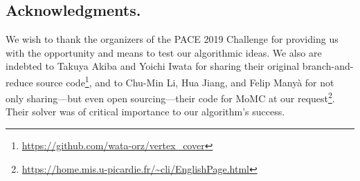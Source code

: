 \documentclass[twoside,leqno,twocolumn]{article}
\begin{document}
\subsection*{Acknowledgments.}
We wish to thank the organizers of the PACE 2019 Challenge for providing us with the opportunity and means to test our algorithmic ideas. We also are indebted to Takuya Akiba and  Yoichi Iwata for sharing their original branch-and-reduce source code\footnote{\url{https://github.com/wata-orz/vertex_cover}}, and to Chu-Min Li, Hua Jiang, and Felip Many\`a for not only sharing---but even open sourcing---their code for MoMC at our request\footnote{\url{https://home.mis.u-picardie.fr/~cli/EnglishPage.html}}. Their solver was of critical importance to our algorithm's success.

\vfill
\end{document}
